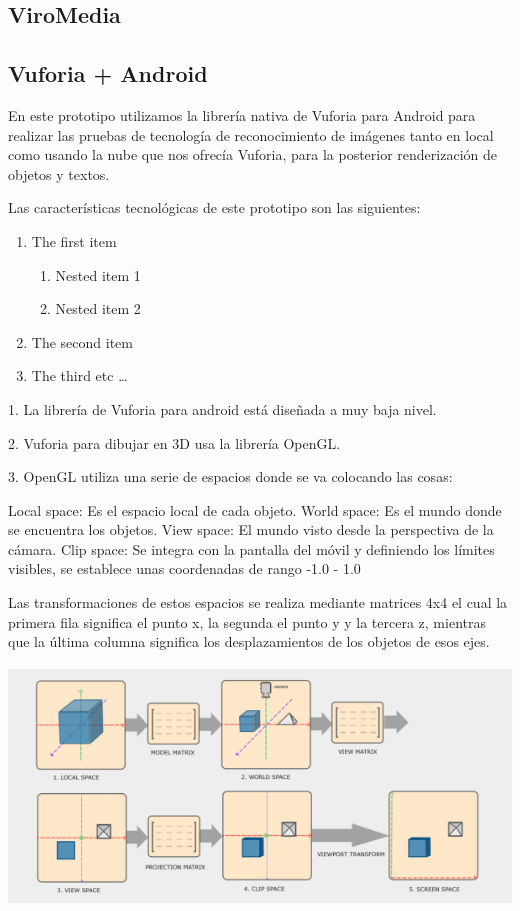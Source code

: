 \subsection{ViroMedia} 
\label{makereference3.6.2} 
 
\subsection{Vuforia + Android} 
\label{makereference3.6.3} 
 
En este prototipo utilizamos la librería nativa de Vuforia para Android para 
realizar las pruebas de tecnología de reconocimiento de imágenes tanto en  
local como usando la nube que nos ofrecía Vuforia, para la posterior renderización
de objetos y textos.

Las características tecnológicas de este prototipo son las siguientes:
\begin{enumerate}
    \item The first item
    \begin{enumerate}
    \item Nested item 1
    \item Nested item 2
    \end{enumerate}
    \item The second item
    \item The third etc \ldots
    \end{enumerate}
1. La librería de Vuforia para android está diseñada a muy baja nivel. 

2. Vuforia para dibujar en 3D usa la librería OpenGL.

3. OpenGL utiliza una serie de espacios donde se va colocando las cosas:

Local space: Es el espacio local de cada objeto.
World space: Es el mundo donde se encuentra los objetos.
View space: El mundo visto desde la perspectiva de la cámara.
Clip space: Se integra con la pantalla del móvil y definiendo los límites 
visibles, se establece unas coordenadas de rango -1.0 - 1.0

Las transformaciones de estos espacios se realiza mediante matrices 4x4 
el cual la primera fila significa el punto x, la segunda el punto y y la 
tercera z, mientras que la última columna significa los desplazamientos 
de los objetos de esos ejes.

\includegraphics[height=2.5in]{figures/space-transformation.png}

